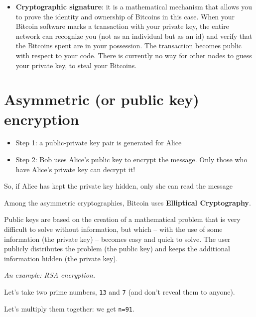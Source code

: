 
\begin{itemize}
    \item \textbf{Cryptographic signature}: it is a mathematical mechanism that allows you to prove the identity and ownership of Bitcoins in this case.
    When your Bitcoin software marks a transaction with your private key, the entire network can recognize you (not as an individual but as an id) and verify that the Bitcoins spent are in your possession. The transaction becomes public with respect to your code. There is currently no way for other nodes to guess your private key, to steal your Bitcoins.
\end{itemize}


\section{Asymmetric (or public key) encryption}

\begin{itemize}
    \item Step 1: a public-private key pair is generated for Alice
    \item Step 2: Bob uses Alice's public key to encrypt the message. Only those who have Alice's private key can decrypt it!
\end{itemize}

So, if Alice has kept the private key hidden, only she can read the message


Among the asymmetric cryptographies, Bitcoin uses \textbf{Elliptical Cryptography}.

Public keys are based on the creation of a mathematical problem that is very difficult to solve without information, but which -- with the use of some information (the private key) -- becomes easy and quick to solve. The user publicly distributes the problem (the public key) and keeps the additional information hidden (the private key).

\textit{An example: RSA encryption.}

Let's take two prime numbers, \texttt{13} and \texttt{7} (and don't reveal them to anyone).

Let's multiply them together: we get \texttt{n=91}.

